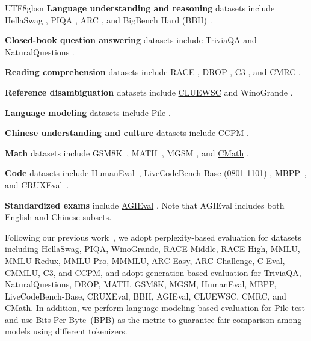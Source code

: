 \documentclass[11pt, a4paper, logo, copyright, nonumbering]{deepseek}
\begin{document}
\begin{CJK*}{UTF8}{gbsn}
\textbf{Language understanding and reasoning} datasets include HellaSwag \citep{hellaswag}, PIQA \citep{piqa}, ARC \citep{arc}, and BigBench Hard (BBH) \citep{bbh}.

\textbf{Closed-book question answering} datasets include TriviaQA \citep{joshi-etal-2017-triviaqa} and NaturalQuestions \citep{naturalquestions}.

\textbf{Reading comprehension} datasets include RACE \cite{race}, DROP \citep{drop}, \underline{C3} \citep{sun2019investigating}, and \underline{CMRC} \citep{cui-etal-2019-span}.

\textbf{Reference disambiguation} datasets include \underline{CLUEWSC} \citep{clue} and WinoGrande \cite{sakaguchi2019winogrande}.

\textbf{Language modeling} datasets include Pile \citep{pile}.

\textbf{Chinese understanding and culture} datasets include \underline{CCPM} \citep{li2021ccpm}.

\textbf{Math} datasets include GSM8K~\citep{gsm8k}, MATH~\citep{hendrycks2021measuring}, MGSM \citep{mgsm}, and \underline{CMath} \citep{wei2023cmath}.

\textbf{Code} datasets include HumanEval~\citep{codex}, LiveCodeBench-Base (0801-1101) \citep{livecodebench}, MBPP~\citep{mbpp}, and CRUXEval~\citep{gu2024cruxeval}.

\textbf{Standardized exams} include \underline{AGIEval} \citep{agieval}. 
Note that AGIEval includes both English and Chinese subsets.

Following our previous work~\citep{dsvi,dsvii}, we adopt perplexity-based evaluation for datasets including HellaSwag, PIQA, WinoGrande, RACE-Middle, RACE-High, MMLU, MMLU-Redux, MMLU-Pro, MMMLU, ARC-Easy, ARC-Challenge, C-Eval, CMMLU, C3, and CCPM, and adopt generation-based evaluation for TriviaQA, NaturalQuestions, DROP, MATH, GSM8K, MGSM, HumanEval, MBPP, LiveCodeBench-Base, CRUXEval, BBH, AGIEval, CLUEWSC, CMRC, and CMath. 
In addition, we perform language-modeling-based evaluation for Pile-test and use Bits-Per-Byte~(BPB) as the metric to guarantee fair comparison among models using different tokenizers. 


\end{CJK*}
\end{document}

